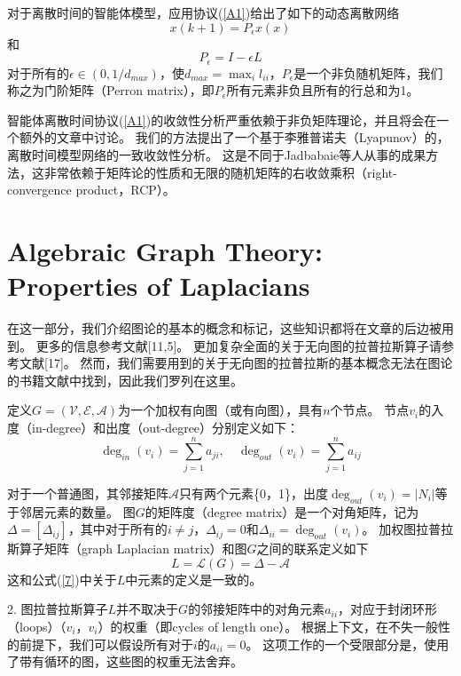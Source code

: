 \documentclass{article}
\begin{document}
对于离散时间的智能体模型，应用协议(\ref{A1})给出了如下的动态离散网络
\begin{equation}
    x(k+1) = P_\epsilon x(x)
\end{equation}
和
\begin{equation}
    P_\epsilon = I - \epsilon L
\end{equation}
对于所有的$\epsilon\in (0,1/d_{max})$，使$d_{max} = \max_il_{ii}$，$P_\epsilon$是一个非负随机矩阵，我们称之为门阶矩阵（Perron matrix），即$P_\epsilon$所有元素非负且所有的行总和为1。

智能体离散时间协议(\ref{A1})的收敛性分析严重依赖于非负矩阵理论，并且将会在一个额外的文章中讨论。
我们的方法提出了一个基于李雅普诺夫（Lyapunov）的，离散时间模型网络的一致收敛性分析。
这是不同于Jadbabaie等人从事的成果方法，这非常依赖于矩阵论的性质和无限的随机矩阵的右收敛乘积（right-convergence product，RCP）。


\section{Algebraic Graph Theory: Properties of Laplacians}
在这一部分，我们介绍图论的基本的概念和标记，这些知识都将在文章的后边被用到。
更多的信息参考文献[11,5]。
更加复杂全面的关于无向图的拉普拉斯算子请参考文献[17]。
然而，我们需要用到的关于无向图的拉普拉斯的基本概念无法在图论的书籍文献中找到，因此我们罗列在这里。

定义$G=(\mathcal{V}, \mathcal{E}, \mathcal{A})$为一个加权有向图（或有向图），具有$n$个节点。
节点$v_i$的入度（in-degree）和出度（out-degree）分别定义如下：
\begin{equation}
    \deg_{in}(v_i) = \sum_{j=1}^{n}a_{ji},\quad \deg_{out}(v_i) = \sum_{j=1}^{n}a_{ij}
\end{equation}

对于一个普通图，其邻接矩阵$\mathcal{A}$只有两个元素\{0，1\}，出度$\deg_{out}(v_i) = |N_i|$等于邻居元素的数量。
图$G$的矩阵度（degree matrix）是一个对角矩阵，记为$\Delta=[\Delta_{ij}]$，其中对于所有的$i\ne j$，$\Delta_{ij}=0$和$\Delta_{ii}=\deg_{out}(v_i)$。
加权图拉普拉斯算子矩阵（graph Laplacian matrix）和图$G$之间的联系定义如下
\begin{equation}
    L = \mathcal{L}(G) = \Delta-\mathcal{A}
\end{equation}
这和公式(\ref{7})中关于$L$中元素的定义是一致的。

 2. 图拉普拉斯算子$L$并不取决于$G$的邻接矩阵中的对角元素$a_{ii}$，对应于封闭环形（loops）（$v_i$，$v_i$）的权重（即cycles of length one）。
根据上下文，在不失一般性的前提下，我们可以假设所有对于$i$的$a_{ii}=0$。
这项工作的一个受限部分是，使用了带有循环的图，这些图的权重无法舍弃。
\end{document}
